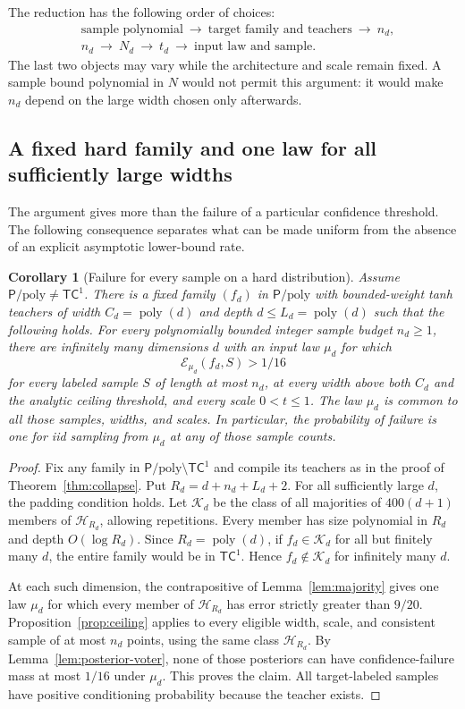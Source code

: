 \documentclass[11pt]{article}
\newtheorem{corollary}[theorem]{Corollary}
\theoremstyle{remark}\newtheorem{remark}[theorem]{Remark}
\newcommand{\Pp}{\mathsf P/\mathrm{poly}}
\newcommand{\TC}{\mathsf{TC}}
\newcommand{\poly}{\operatorname{poly}}
\begin{document}
The reduction has the following order of choices:
\[
 \begin{aligned}
 &\text{sample polynomial}\ \longrightarrow\
 \text{target family and teachers}\ \longrightarrow\ n_d,\\
 &n_d\ \longrightarrow\ N_d\ \longrightarrow\ t_d
 \ \longrightarrow\ \text{input law and sample}.
 \end{aligned}
\]
The last two objects may vary while the architecture and scale remain
fixed. A sample bound polynomial in $N$ would not permit this argument:
it would make $n_d$ depend on the large width chosen only afterwards.

\subsection{A fixed hard family and one law for all sufficiently large widths}

The argument gives more than the failure of a particular confidence
threshold. The following consequence separates what can be made uniform
from the absence of an explicit asymptotic lower-bound rate.

\begin{corollary}[Failure for every sample on a hard distribution]
\label{cor:hard-family}
Assume $\Pp\ne\TC^1$. There is a fixed family $(f_d)$ in $\Pp$ with
bounded-weight tanh teachers of width $C_d=\poly(d)$ and depth
$d\le L_d=\poly(d)$ such that the following holds.
For every polynomially bounded integer sample budget $n_d\ge1$, there
are infinitely many dimensions $d$ with an input law $\mu_d$ for which
\[
 \mathcal E_{\mu_d}(f_d,S)>1/16
\]
for every labeled sample $S$ of length at most $n_d$, at every width above
both $C_d$ and the analytic ceiling threshold, and every scale $0<t\le1$.
The law $\mu_d$ is common to all those samples, widths, and scales.
In particular, the probability of failure is one for iid sampling from
$\mu_d$ at any of those sample counts.
\end{corollary}
\begin{proof}
Fix any family in $\Pp\setminus\TC^1$ and compile its teachers as in the
proof of Theorem~\ref{thm:collapse}. Put $R_d=d+n_d+L_d+2$.
For all sufficiently large $d$, the padding condition holds. Let
$\mathcal K_d$ be the class of all majorities of $400(d+1)$ members
of $\mathcal H_{R_d}$, allowing repetitions.
Every member has size polynomial in $R_d$ and depth $O(\log R_d)$.
Since $R_d=\poly(d)$, if $f_d\in\mathcal K_d$ for all but finitely many
$d$, the entire family would be in $\TC^1$. Hence $f_d\notin\mathcal K_d$
for infinitely many $d$.

At each such dimension, the contrapositive of
Lemma~\ref{lem:majority} gives one law $\mu_d$ for which every member of
$\mathcal H_{R_d}$ has error strictly greater than $9/20$.
Proposition~\ref{prop:ceiling} applies to every eligible width, scale,
and consistent sample of at most $n_d$ points, using the same class
$\mathcal H_{R_d}$. By Lemma~\ref{lem:posterior-voter}, none of those
posteriors can have confidence-failure mass at most $1/16$ under $\mu_d$.
This proves the claim. All target-labeled samples have positive
conditioning probability because the teacher exists.
\end{proof}
\end{document}
